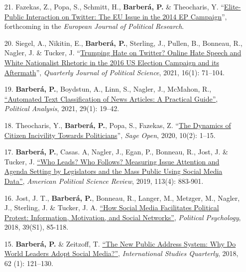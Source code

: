 \documentclass[margin,line,11pt]{resume}
\begin{document}
\begin{resume}
\begin{itemize}[leftmargin=5.5mm]
\item[21.] 
Fazekas, Z., Popa, S., Schmitt, H., \textbf{Barber\'{a}, P.} \& Theocharis, Y. ``\href{https://ejpr.onlinelibrary.wiley.com/doi/abs/10.1111/1475-6765.12402}{Elite-Public Interaction on Twitter: The EU Issue in the 2014 EP Campaign}'', forthcoming in the \textit{European Journal of Political Research}.

\item[20.] Siegel, A., Nikitin, E., \textbf{Barber\'{a}, P.}, Sterling, J., Pullen, B., Bonneau, R., Nagler, J. \& Tucker, J. ``\href{http://dx.doi.org/10.1561/100.00019045}{Trumping Hate on Twitter? Online Hate Speech and White Nationalist Rhetoric in the 2016 US Election Campaign and its Aftermath}'', \textit{Quarterly Journal of Political Science}, 2021, 16(1): 71--104.

\item[19.] \textbf{Barber\'{a}, P.}, Boydstun, A., Linn, S., Nagler, J., McMahon, R.,  \href{https://www.cambridge.org/core/journals/political-analysis/article/automated-text-classification-of-news-articles-a-practical-guide/10462DB284B1CD80C0FAE796AD786BC6}{``Automated Text Classification of News Articles: A Practical Guide''}, \textit{Political Analysis}, 2021, 29(1): 19--42.

\item[18.] Theocharis, Y., \textbf{Barber\'{a}, P.}, Popa, S., Fazekas, Z. ``\href{https://journals.sagepub.com/doi/full/10.1177/2158244020919447}{The Dynamics of Citizen Incivility Towards Politicians}'', \textit{Sage Open}, 2020, 10(2): 1--15.

\item[17.] \textbf{Barber\'{a}, P.}, Casas. A, Nagler, J., Egan, P., Bonneau, R., Jost, J. \& Tucker, J. \href{https://t.co/6KnjCczsqH}{``Who Leads? Who Follows? Measuring Issue Attention and Agenda Setting by Legislators and the Mass Public Using Social Media Data''}, \textit{American Political Science Review}, 2019, 113(4): 883-901.

\newpage   

\item[16.] Jost, J. T., \textbf{Barber\'{a}, P.}, Bonneau, R., Langer, M., Metzger, M., Nagler, J., Sterling, J. \& Tucker, J. A. \href{http://onlinelibrary.wiley.com/doi/10.1111/pops.12478/full}{``How Social Media Facilitates Political Protest: Information, Motivation, and Social Networks''}, \textit{Political Psychology}, 2018, 39(S1), 85-118.

\item[15.] \textbf{Barber\'{a}, P.} \& Zeitzoff, T. \href{https://academic.oup.com/isq/article/doi/10.1093/isq/sqx047/4430887/The-New-Public-Address-System-Why-Do-World-Leaders}{``The New Public Address System: Why Do World Leaders Adopt Social Media?''}, \textit{International Studies Quarterly}, 2018, 62 (1): 121--130.
    

\end{itemize}
\end{resume}
\end{document}
